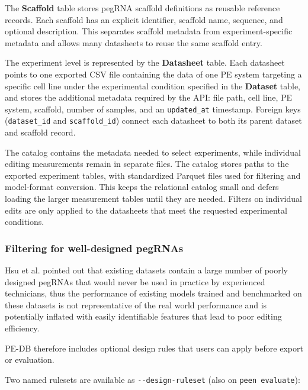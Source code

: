 \documentclass{article}
\begin{document}
The \textbf{Scaffold} table stores pegRNA scaffold definitions as reusable reference records. Each scaffold has an explicit identifier, scaffold name, sequence, and optional description. This separates scaffold metadata from experiment-specific metadata and allows many datasheets to reuse the same scaffold entry.

The experiment level is represented by the \textbf{Datasheet} table. Each datasheet points to one exported CSV file containing the data of one PE system targeting a specific cell line under the experimental condition specified in the \textbf{Dataset} table, and stores the additional metadata required by the API: file path, cell line, PE system, scaffold, number of samples, and an \nolinkurl{updated\_at} timestamp. Foreign keys (\nolinkurl{dataset\_id} and \nolinkurl{scaffold\_id}) connect each datasheet to both its parent dataset and scaffold record.

The catalog contains the metadata needed to select experiments, while individual editing measurements remain in separate files. The catalog stores paths to the exported experiment tables, with standardized Parquet files used for filtering and model-format conversion. This keeps the relational catalog small and defers loading the larger measurement tables until they are needed. Filters on individual edits are only applied to the datasheets that meet the requested experimental conditions.

\subsubsection{Filtering for well-designed pegRNAs}
Hsu et al. \cite{hsuMechanisticMachineLearning2026} pointed out that existing datasets contain a large number of poorly designed pegRNAs that would never be used in practice by experienced technicians, thus the performance of existing models trained and benchmarked on these datasets is not representative of the real world performance and is potentially inflated with easily identifiable features that lead to poor editing efficiency.

PE-DB therefore includes optional design rules that users can apply before export or evaluation.

Two named rulesets are available as \nolinkurl{--design-ruleset} (also on \nolinkurl{peen evaluate}):
\end{document}
